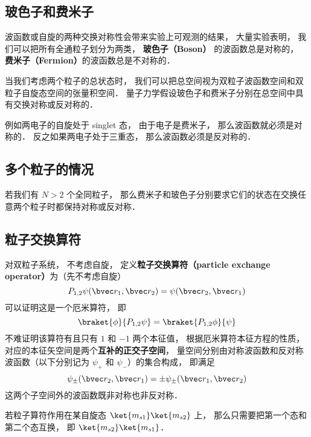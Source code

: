 \subsection{玻色子和费米子}
波函数或自旋的两种交换对称性会带来实验上可观测的结果， 大量实验表明， 我们可以把所有全通粒子划分为两类， \textbf{玻色子（Boson）} 的波函数总是对称的， \textbf{费米子（Fermion）}的波函数总是不对称的．

当我们考虑两个粒子的总状态时， 我们可以把总空间视为双粒子波函数空间和双粒子自旋态空间的张量积空间． 量子力学假设玻色子和费米子分别在总空间中具有交换对称或反对称的．

例如两电子的自旋处于 singlet 态， 由于电子是费米子， 那么波函数就必须是对称的． 反之如果两电子处于三重态， 那么波函数必须是反对称的．

\subsection{多个粒子的情况}
若我们有 $N > 2$ 个全同粒子， 那么费米子和玻色子分别要求它们的状态在交换任意两个粒子时都保持对称或反对称．

\subsection{粒子交换算符}

对双粒子系统， 不考虑自旋， 定义\textbf{粒子交换算符（particle exchange operator）}为（先不考虑自旋）
\begin{equation}\label{IdPar_eq3}
P_{1,2}\psi(\bvec r_1, \bvec r_2) = \psi(\bvec r_2, \bvec r_1)
\end{equation}
可以证明这是一个厄米算符， 即
\begin{equation}
\braket{\phi}{P_{1,2}\psi} = \braket{P_{1,2}\phi}{\psi}
\end{equation}
不难证明该算符有且只有 $1$ 和 $-1$ 两个本征值， 根据厄米算符本征方程的性质， 对应的本征矢空间是两个\textbf{互补的正交子空间}， 量空间分别由对称波函数和反对称波函数（以下分别记为 $\psi_+$ 和 $\psi_-$）的集合构成， 即满足
\begin{equation}
\psi_\pm(\bvec r_2, \bvec r_1) = \pm\psi_\pm(\bvec r_1, \bvec r_2)
\end{equation}
这两个子空间外的波函数既非对称也非反对称．

若粒子算符作用在某自旋态 $\ket{m_{s1}}\ket{m_{s2}}$ 上， 那么只需要把第一个态和第二个态互换， 即 $\ket{m_{s2}}\ket{m_{s1}}$．

